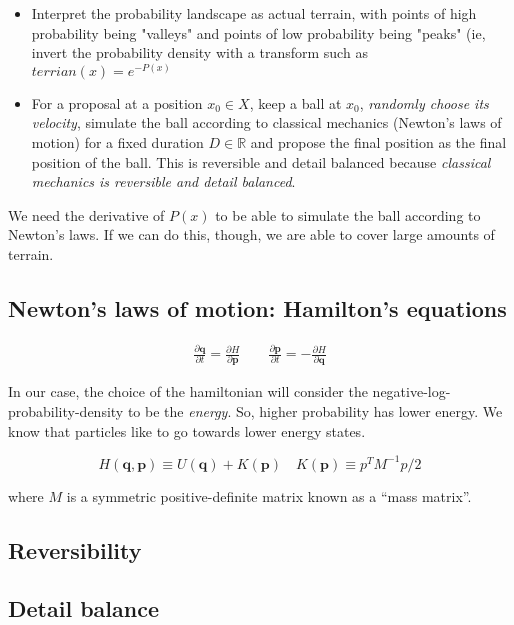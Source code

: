 \documentclass[titlepage]{article}
\newcommand{\R}{\mathbb{R}}
\newcommand{\p}{\mathbf{p}}
\newcommand{\q}{\mathbf{q}}
\begin{document}
\begin{itemize}
    \item Interpret the probability landscape as actual terrain, with
        points of high probability being "valleys" and points of low probability
        being "peaks" (ie, invert the probability density with a transform
        such as $terrian(x) = e^{-P(x)}$
    \item For a proposal at a position $x_0 \in X$, keep a ball at $x_0$,
        \emph{randomly choose its velocity}, simulate the ball according to 
        classical mechanics (Newton's laws of motion) for a fixed duration $D \in \R$
        and propose the final position as the final position of the ball. This
        is reversible and detail balanced because 
        \emph{classical mechanics is reversible and detail balanced}.
\end{itemize}
We need the derivative of $P(x)$ to be able to simulate the ball according
to Newton's laws. If we can do this, though, we are able to cover large
amounts of terrain.


\subsection{Newton's laws of motion: Hamilton's equations}

\begin{align*}
    \frac{\partial \q}{\partial t} = \frac{\partial H}{\partial \p} \qquad
    \frac{\partial \p}{\partial t} = - \frac{\partial H}{\partial \q}
\end{align*}

In our case, the choice of the hamiltonian will consider the negative-log-probability-density
to be the \emph{energy}. So, higher probability has lower energy. We know that
particles like to go towards lower energy states.

$$
H(\q, \p) \equiv  U(\q) + K(\p) \quad K(\p) \equiv p^T M^{-1} p/2
$$

where $M$ is a symmetric positive-definite matrix known as a ``mass matrix''.


\subsection{Reversibility}

\subsection{Detail balance}
\end{document}
